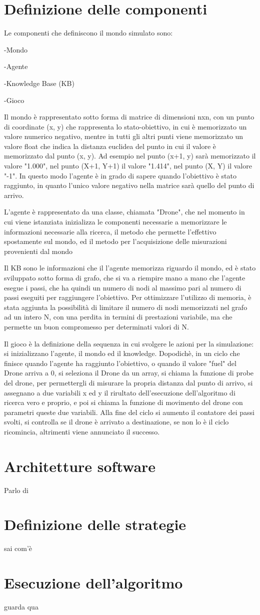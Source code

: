 \section{Definizione delle componenti}
Le componenti che definiscono il mondo simulato sono:

-Mondo

-Agente

-Knowledge Base (KB)

-Gioco


Il mondo è rappresentato sotto forma di matrice di dimensioni nxn, con un punto di coordinate (x, y) che rappresenta lo stato-obiettivo, in cui è memorizzato un valore numerico negativo, mentre in tutti gli altri punti viene memorizzato un valore float che indica la distanza euclidea del punto in cui il valore è memorizzato dal punto (x, y). Ad esempio nel punto (x+1, y) sarà memorizzato il valore "1.000", nel punto (X+1, Y+1) il valore "1.414", nel punto (X, Y) il valore "-1". In questo modo l'agente è in grado di sapere quando l'obiettivo è stato raggiunto, in quanto l'unico valore negativo nella matrice sarà quello del punto di arrivo.

L'agente è rappresentato da una classe, chiamata "Drone", che nel momento in cui viene istanziata inizializza le componenti necessarie a memorizzare le informazioni necessarie alla ricerca, il metodo che permette l'effettivo spostamente sul mondo, ed il metodo per l'acquisizione delle misurazioni provenienti dal mondo

Il KB sono le informazioni che il l'agente memorizza riguardo il mondo, ed è stato sviluppato sotto forma di grafo, che si va a riempire mano a mano che l'agente esegue i passi, che ha quindi un numero di nodi al massimo pari al numero di passi eseguiti per raggiungere l'obiettivo. Per ottimizzare l'utilizzo di memoria, è stata aggiunta la possibilità di limitare il numero di nodi memorizzati nel grafo ad un intero N, con una perdita in termini di prestazioni variabile, ma che permette un buon compromesso per determinati valori di N.

Il gioco è la definizione della sequenza in cui svolgere le azioni per la simulazione: si inizializzano l'agente, il mondo ed il knowledge. Dopodichè, in un ciclo che finisce quando l'agente ha raggiunto l'obiettivo, o quando il valore "fuel" del Drone arriva a 0, si seleziona il Drone da un array, si chiama la funzione di probe del drone, per permettergli di misurare la propria distanza dal punto di arrivo, si assegnano a due variabili x ed y il rirultato dell'esecuzione dell'algoritmo di ricerca vero e proprio, e poi si chiama la funzione di movimento del drone con parametri queste due variabili. Alla fine del ciclo si aumento il contatore dei passi svolti, si controlla se il drone è arrivato a destinazione, se non lo è il ciclo ricomincia, altrimenti viene annunciato il successo.

	
\section{Architetture software}
	Parlo di
	
\section{Definizione delle strategie}
	sai com'è
	
\section{Esecuzione dell'algoritmo}
	guarda qua